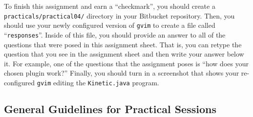 To finish this assignment and earn a ``checkmark'', you should create a {\tt practicals/practical04/}
directory in your Bitbucket repository. Then, you should use your newly configured version of {\tt gvim} to create a
file called ``{\tt responses}''. Inside of this file, you should provide an answer to all of the questions that were
posed in this assignment sheet. That is, you can retype the question that you see in the assignment sheet and then write
your answer below it. For example, one of the questions that the assignment poses is ``how does your chosen plugin
work?'' Finally, you should turn in a screenshot that shows your re-configured {\tt gvim} editing the {\tt Kinetic.java}
program.

\vspace*{-.15in}
\subsection*{General Guidelines for Practical Sessions}
\vspace*{-.05in}

